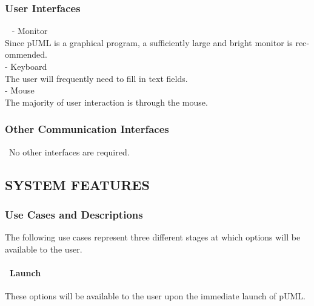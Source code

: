 \documentclass[twoside,letterpaper]{article}
\begin{document}
\subsubsection[User Interfaces]{\rmfamily\bfseries\color{black}
User Interfaces}
{\color{black}
\foreignlanguage{english}{\ }\foreignlanguage{english}
{
- Monitor
\\  Since pUML is a graphical program, a sufficiently large and bright monitor is recommended.
\\- Keyboard
\\  The user will frequently need to fill in text fields.
\\- Mouse
\\  The majority of user interaction is through the mouse.}}

\subsubsection[Other Communication
Interfaces]{\rmfamily\bfseries\color{black}
Other Communication Interfaces}
{\color{black}
\foreignlanguage{english}{\ }\foreignlanguage{english}{No other interfaces are required. }}



\bigskip


\bigskip

\bigskip









\clearpage\setcounter{page}{1}\pagestyle{Convertv}
\subsection[SYSTEM FEATURES]{\rmfamily\bfseries\color{black}
SYSTEM FEATURES}





\subsubsection{Use Cases and Descriptions}
{\color{black}
The following use cases represent three different stages at which options will be available to the user.
}


\paragraph[\ Use Category]
{\ Launch} {\color{black}
These options will be available to the user upon the immediate launch of pUML.
}
\end{document}

